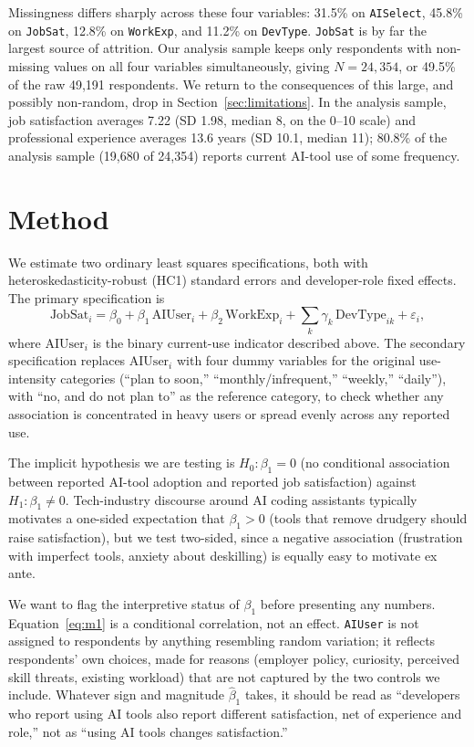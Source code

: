\documentclass[11pt]{article}
\begin{document}
Missingness differs sharply across these four variables: 31.5\% on
\texttt{AISelect}, 45.8\% on \texttt{JobSat}, 12.8\% on \texttt{WorkExp},
and 11.2\% on \texttt{DevType}. \texttt{JobSat} is by far the largest
source of attrition. Our analysis sample keeps only respondents with
non-missing values on all four variables simultaneously, giving
$N = 24{,}354$, or 49.5\% of the raw 49{,}191 respondents. We return to
the consequences of this large, and possibly non-random, drop in
Section~\ref{sec:limitations}. In the analysis sample, job satisfaction
averages 7.22 (SD 1.98, median 8, on the 0--10 scale) and professional
experience averages 13.6 years (SD 10.1, median 11); 80.8\% of the
analysis sample (19,680 of 24,354) reports current AI-tool use of some
frequency.

\section{Method}

We estimate two ordinary least squares specifications, both with
heteroskedasticity-robust (HC1) standard errors and developer-role fixed
effects. The primary specification is
\begin{equation}
  \mathrm{JobSat}_i = \beta_0 + \beta_1\, \mathrm{AIUser}_i + \beta_2\, \mathrm{WorkExp}_i
  + \sum_k \gamma_k\, \mathrm{DevType}_{ik} + \varepsilon_i,
  \label{eq:m1}
\end{equation}
where $\mathrm{AIUser}_i$ is the binary current-use indicator described
above. The secondary specification replaces $\mathrm{AIUser}_i$ with four
dummy variables for the original use-intensity categories (``plan to soon,''
``monthly/infrequent,'' ``weekly,'' ``daily''), with ``no, and do not plan
to'' as the reference category, to check whether any association is
concentrated in heavy users or spread evenly across any reported use.

The implicit hypothesis we are testing is $H_0: \beta_1 = 0$ (no
conditional association between reported AI-tool adoption and reported job
satisfaction) against $H_1: \beta_1 \neq 0$. Tech-industry discourse around
AI coding assistants typically motivates a one-sided expectation that
$\beta_1 > 0$ (tools that remove drudgery should raise satisfaction), but
we test two-sided, since a negative association (frustration with imperfect
tools, anxiety about deskilling) is equally easy to motivate ex ante.

We want to flag the interpretive status of $\beta_1$ before presenting any
numbers. Equation~\eqref{eq:m1} is a conditional correlation, not an effect.
\texttt{AIUser} is not assigned to respondents by anything resembling
random variation; it reflects respondents' own choices, made for reasons
(employer policy, curiosity, perceived skill threats, existing workload)
that are not captured by the two controls we include. Whatever sign and
magnitude $\hat\beta_1$ takes, it should be read as ``developers who
report using AI tools also report different satisfaction, net of experience
and role,'' not as ``using AI tools changes satisfaction.''
\end{document}
